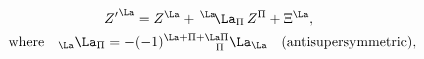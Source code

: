 \begin{equation} \label{iosp}
\begin{split}
{Z'}^\La& =Z^\La+\,^\La\!\La_\Pi\,Z^\Pi+\Xi^\La, \\
\text{where} \quad _\La\La_\Pi =-&(-1)^{\La+\Pi+\La\Pi}_{\qquad\qquad\!\!\Pi}\La_\La \quad\text{(antisupersymmetric)},
\end{split}
\end{equation} 
